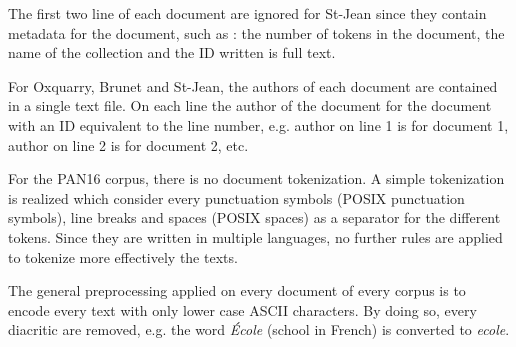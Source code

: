 The first two line of each document are ignored for St-Jean since they contain metadata for the document, such as : the number of tokens in the document, the name of the collection and the ID written is full text.

For Oxquarry, Brunet and St-Jean, the authors of each document are contained in a single text file.
On each line the author of the document for the document with an ID equivalent to the line number, e.g. author on line 1 is for document 1, author on line 2 is for document 2, etc.

For the PAN16 corpus, there is no document tokenization.
A simple tokenization is realized which consider every punctuation symbols (POSIX punctuation symbols), line breaks and spaces (POSIX spaces) as a separator for the different tokens.
Since they are written in multiple languages, no further rules are applied to tokenize more effectively the texts.

The general preprocessing applied on every document of every corpus is to encode every text with only lower case ASCII characters.
By doing so, every diacritic are removed, e.g. the word \textit{École} (school in French) is converted to \textit{ecole}.
